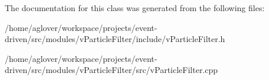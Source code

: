 The documentation for this class was generated from the following files\+:\begin{DoxyCompactItemize}
\item 
/home/aglover/workspace/projects/event-\/driven/src/modules/v\+Particle\+Filter/include/v\+Particle\+Filter.\+h\item 
/home/aglover/workspace/projects/event-\/driven/src/modules/v\+Particle\+Filter/src/v\+Particle\+Filter.\+cpp\end{DoxyCompactItemize}
